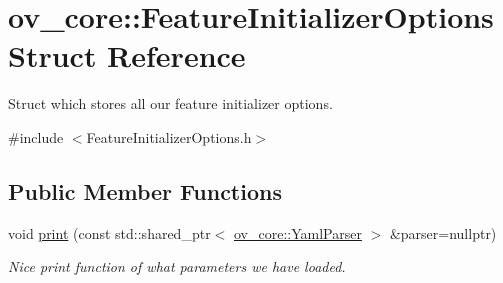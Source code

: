 \hypertarget{structov__core_1_1FeatureInitializerOptions}{}\section{ov\+\_\+core\+:\+:Feature\+Initializer\+Options Struct Reference}
\label{structov__core_1_1FeatureInitializerOptions}


Struct which stores all our feature initializer options.  




{\ttfamily \#include $<$Feature\+Initializer\+Options.\+h$>$}

\subsection*{Public Member Functions}
\begin{DoxyCompactItemize}
\item 
\mbox{\label{structov__core_1_1FeatureInitializerOptions_ac4daa94e8d53f30a8b12bfb8261004c4}} 
void \hyperlink{structov__core_1_1FeatureInitializerOptions_ac4daa94e8d53f30a8b12bfb8261004c4}{print} (const std\+::shared\+\_\+ptr$<$ \hyperlink{classov__core_1_1YamlParser}{ov\+\_\+core\+::\+Yaml\+Parser} $>$ \&parser=nullptr)
\begin{DoxyCompactList}\small\item\em Nice print function of what parameters we have loaded. \end{DoxyCompactList}\end{DoxyCompactItemize}
